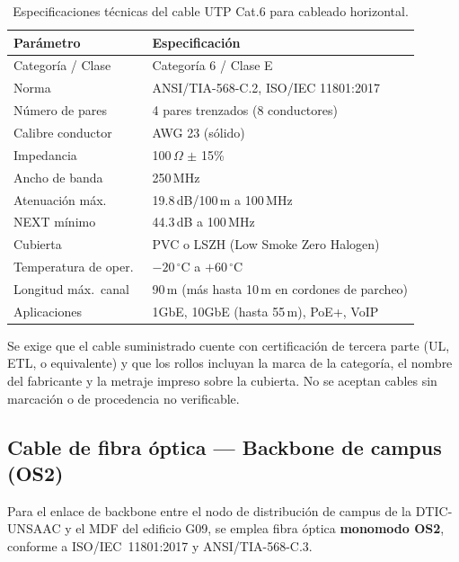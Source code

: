 \begin{table}[H]
    \centering
    \caption{Especificaciones técnicas del cable UTP Cat.6 para cableado horizontal.}
    \label{tab:cable_utp}
    \begin{tabular}{|p{5cm}|p{8.5cm}|}
        \hline
        \textbf{Parámetro} & \textbf{Especificación} \\
        \hline
        Categoría / Clase     & Categoría 6 / Clase E \\
        \hline
        Norma                 & ANSI/TIA-568-C.2, ISO/IEC 11801:2017 \\
        \hline
        Número de pares       & 4 pares trenzados (8 conductores) \\
        \hline
        Calibre conductor     & AWG 23 (sólido) \\
        \hline
        Impedancia            & 100\,$\Omega$ $\pm$ 15\% \\
        \hline
        Ancho de banda        & 250\,MHz \\
        \hline
        Atenuación máx.\      & 19.8\,dB/100\,m a 100\,MHz \\
        \hline
        NEXT mínimo           & 44.3\,dB a 100\,MHz \\
        \hline
        Cubierta              & PVC o LSZH (Low Smoke Zero Halogen) \\
        \hline
        Temperatura de oper.\ & $-20\,^\circ$C a $+60\,^\circ$C \\
        \hline
        Longitud máx.\ canal  & 90\,m (más hasta 10\,m en cordones de parcheo) \\
        \hline
        Aplicaciones          & 1GbE, 10GbE (hasta 55\,m), PoE+, VoIP \\
        \hline
    \end{tabular}
\end{table}

Se exige que el cable suministrado cuente con certificación de tercera parte
(UL, ETL, o equivalente) y que los rollos incluyan la marca de la categoría,
el nombre del fabricante y la metraje impreso sobre la cubierta. No se aceptan
cables sin marcación o de procedencia no verificable.

\subsection{Cable de fibra óptica — Backbone de campus (OS2)}

Para el enlace de backbone entre el nodo de distribución de campus de la
DTIC-UNSAAC y el MDF del edificio G09, se emplea fibra óptica
\textbf{monomodo OS2}, conforme a \mbox{ISO/IEC 11801:2017} y
\mbox{ANSI/TIA-568-C.3}.


